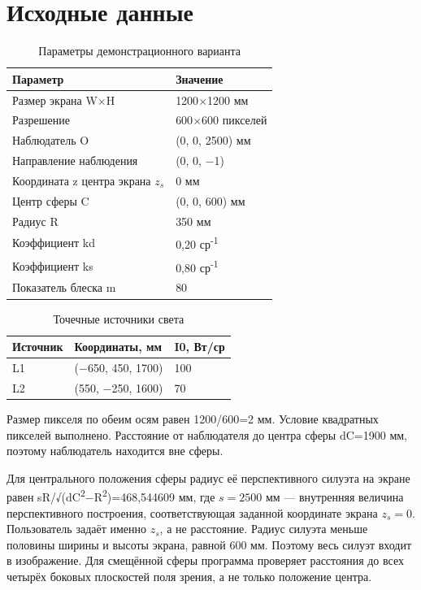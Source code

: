 \documentclass[a4paper,12pt]{article}
\begin{document}
\section{Исходные данные}
\begin{table}[H]
\centering
\caption{Параметры демонстрационного варианта}
\begin{tabular}{@{}p{}p{}@{}}
\toprule
Параметр & Значение \\
\midrule
Размер экрана W\ensuremath{\times}H & 1200\ensuremath{\times}1200 мм \\
Разрешение & 600\ensuremath{\times}600 пикселей \\
Наблюдатель O & (0, 0, 2500) мм \\
Направление наблюдения & (0, 0, \ensuremath{-}1) \\
Координата z центра экрана $z_s$ & 0 мм \\
Центр сферы C & (0, 0, 600) мм \\
Радиус R & 350 мм \\
Коэффициент kd & 0,20 ср\textsuperscript{-}\textsuperscript{1} \\
Коэффициент ks & 0,80 ср\textsuperscript{-}\textsuperscript{1} \\
Показатель блеска m & 80 \\
\bottomrule
\end{tabular}
\end{table}
\begin{table}[H]
\centering
\caption{Точечные источники света}
\begin{tabular}{@{}p{}p{}p{}@{}}
\toprule
Источник & Координаты, мм & I0, Вт/ср \\
\midrule
L1 & (\ensuremath{-}650, 450, 1700) & 100 \\
L2 & (550, \ensuremath{-}250, 1600) & 70 \\
\bottomrule
\end{tabular}
\end{table}
Размер пикселя по обеим осям равен 1200/600=2 мм. Условие квадратных пикселей выполнено. Расстояние от наблюдателя до центра сферы dC=1900 мм, поэтому наблюдатель находится вне сферы.

Для центрального положения сферы радиус её перспективного силуэта на экране равен sR/√(dC\textsuperscript{2}\ensuremath{-}R\textsuperscript{2})=468,544609 мм, где $s=2500$ мм — внутренняя величина перспективного построения, соответствующая заданной координате экрана $z_s=0$. Пользователь задаёт именно $z_s$, а не расстояние. Радиус силуэта меньше половины ширины и высоты экрана, равной 600 мм. Поэтому весь силуэт входит в изображение. Для смещённой сферы программа проверяет расстояния до всех четырёх боковых плоскостей поля зрения, а не только положение центра.
\end{document}
